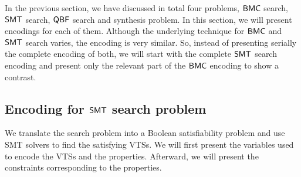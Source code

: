 \noindent In the previous section, we have discussed in total four problems, $\mathsf{BMC}$ search, $\mathsf{SMT}$ search, $\mathsf{QBF}$ search and synthesis problem.
%
In this section, we will present encodings for each of them.
%
Although the underlying technique for $\mathsf{BMC}$ and $\mathsf{SMT}$ search varies, the encoding is very similar. 
%
So, instead of presenting serially the complete encoding of both, we will start with the complete $\mathsf{SMT}$ search encoding and present only the relevant part of the $\mathsf{BMC}$ encoding to show a contrast.

\subsection{Encoding for $\mathsf{SMT}$ search problem}
\label{enc:smt}

\noindent We translate the search problem into a Boolean satisfiability
problem and use SMT solvers to find the satisfying VTSs.
%
We will first present the variables used to encode the
VTSs and the properties.
%
Afterward, we will present the constraints corresponding to the
properties.


